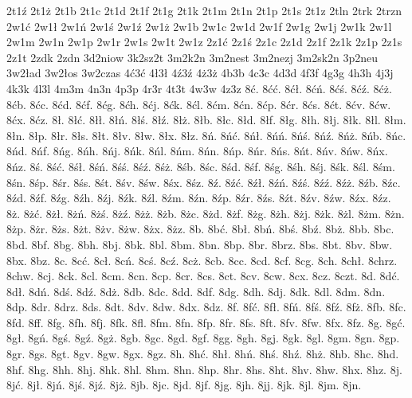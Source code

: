 {2t1\'z
2t1\.z
2t1b
2t1c
2t1d
2t1f
2t1g
2t1k
2t1m
2t1n
2t1p
2t1s
2t1z
2tln
2trk
2trzn
2w1\'c
2w1\l 
2w1\'n
2w1\'s
2w1\'z
2w1\.z
2w1b
2w1c
2w1d
2w1f
2w1g
2w1j
2w1k
2w1l
2w1m
2w1n
2w1p
2w1r
2w1s
2w1t
2w1z
2z1\'c
2z1\'s
2z1c
2z1d
2z1f
2z1k
2z1p
2z1s
2z1t
2zdk
2zdn
3d2niow
3k2sz2t
3m2k2n
3m2nest
3m2nezj
3m2sk2n
3p2neu
3w2\l ad
3w2\l os
3w2czas
4\'c3\'c
4\l 3\l 
4\'z3\'z
4\.z3\.z
4b3b
4c3c
4d3d
4f3f
4g3g
4h3h
4j3j
4k3k
4l3l
4m3m
4n3n
4p3p
4r3r
4t3t
4w3w
4z3z
8\'c.
8\'c\'c.
8\'c\l .
8\'c\'n.
8\'c\'s.
8\'c\'z.
8\'c\.z.
8\'cb.
8\'cc.
8\'cd.
8\'cf.
8\'cg.
8\'ch.
8\'cj.
8\'ck.
8\'cl.
8\'cm.
8\'cn.
8\'cp.
8\'cr.
8\'cs.
8\'ct.
8\'cv.
8\'cw.
8\'cx.
8\'cz.
8\l .
8\l \'c.
8\l \l .
8\l \'n.
8\l \'s.
8\l \'z.
8\l \.z.
8\l b.
8\l c.
8\l d.
8\l f.
8\l g.
8\l h.
8\l j.
8\l k.
8\l l.
8\l m.
8\l n.
8\l p.
8\l r.
8\l s.
8\l t.
8\l v.
8\l w.
8\l x.
8\l z.
8\'n.
8\'n\'c.
8\'n\l .
8\'n\'n.
8\'n\'s.
8\'n\'z.
8\'n\.z.
8\'nb.
8\'nc.
8\'nd.
8\'nf.
8\'ng.
8\'nh.
8\'nj.
8\'nk.
8\'nl.
8\'nm.
8\'nn.
8\'np.
8\'nr.
8\'ns.
8\'nt.
8\'nv.
8\'nw.
8\'nx.
8\'nz.
8\'s.
8\'s\'c.
8\'s\l .
8\'s\'n.
8\'s\'s.
8\'s\'z.
8\'s\.z.
8\'sb.
8\'sc.
8\'sd.
8\'sf.
8\'sg.
8\'sh.
8\'sj.
8\'sk.
8\'sl.
8\'sm.
8\'sn.
8\'sp.
8\'sr.
8\'ss.
8\'st.
8\'sv.
8\'sw.
8\'sx.
8\'sz.
8\'z.
8\'z\'c.
8\'z\l .
8\'z\'n.
8\'z\'s.
8\'z\'z.
8\'z\.z.
8\'zb.
8\'zc.
8\'zd.
8\'zf.
8\'zg.
8\'zh.
8\'zj.
8\'zk.
8\'zl.
8\'zm.
8\'zn.
8\'zp.
8\'zr.
8\'zs.
8\'zt.
8\'zv.
8\'zw.
8\'zx.
8\'zz.
8\.z.
8\.z\'c.
8\.z\l .
8\.z\'n.
8\.z\'s.
8\.z\'z.
8\.z\.z.
8\.zb.
8\.zc.
8\.zd.
8\.zf.
8\.zg.
8\.zh.
8\.zj.
8\.zk.
8\.zl.
8\.zm.
8\.zn.
8\.zp.
8\.zr.
8\.zs.
8\.zt.
8\.zv.
8\.zw.
8\.zx.
8\.zz.
8b.
8b\'c.
8b\l .
8b\'n.
8b\'s.
8b\'z.
8b\.z.
8bb.
8bc.
8bd.
8bf.
8bg.
8bh.
8bj.
8bk.
8bl.
8bm.
8bn.
8bp.
8br.
8brz.
8bs.
8bt.
8bv.
8bw.
8bx.
8bz.
8c.
8c\'c.
8c\l .
8c\'n.
8c\'s.
8c\'z.
8c\.z.
8cb.
8cc.
8cd.
8cf.
8cg.
8ch.
8ch\l .
8chrz.
8chw.
8cj.
8ck.
8cl.
8cm.
8cn.
8cp.
8cr.
8cs.
8ct.
8cv.
8cw.
8cx.
8cz.
8czt.
8d.
8d\'c.
8d\l .
8d\'n.
8d\'s.
8d\'z.
8d\.z.
8db.
8dc.
8dd.
8df.
8dg.
8dh.
8dj.
8dk.
8dl.
8dm.
8dn.
8dp.
8dr.
8drz.
8ds.
8dt.
8dv.
8dw.
8dx.
8dz.
8f.
8f\'c.
8f\l .
8f\'n.
8f\'s.
8f\'z.
8f\.z.
8fb.
8fc.
8fd.
8ff.
8fg.
8fh.
8fj.
8fk.
8fl.
8fm.
8fn.
8fp.
8fr.
8fs.
8ft.
8fv.
8fw.
8fx.
8fz.
8g.
8g\'c.
8g\l .
8g\'n.
8g\'s.
8g\'z.
8g\.z.
8gb.
8gc.
8gd.
8gf.
8gg.
8gh.
8gj.
8gk.
8gl.
8gm.
8gn.
8gp.
8gr.
8gs.
8gt.
8gv.
8gw.
8gx.
8gz.
8h.
8h\'c.
8h\l .
8h\'n.
8h\'s.
8h\'z.
8h\.z.
8hb.
8hc.
8hd.
8hf.
8hg.
8hh.
8hj.
8hk.
8hl.
8hm.
8hn.
8hp.
8hr.
8hs.
8ht.
8hv.
8hw.
8hx.
8hz.
8j.
8j\'c.
8j\l .
8j\'n.
8j\'s.
8j\'z.
8j\.z.
8jb.
8jc.
8jd.
8jf.
8jg.
8jh.
8jj.
8jk.
8jl.
8jm.
8jn.
}
